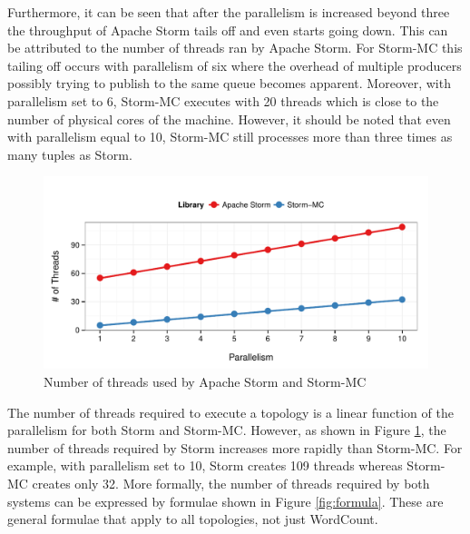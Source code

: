 \documentclass[bsc,deptreport,twoside,singlespacing,normalheadings,parskip]{infthesis}\usepackage[]{graphicx}\usepackage[]{color}
\makeatletter
\def\maxwidth{ %
  \ifdim\Gin@nat@width>\linewidth
    \linewidth
  \else
    \Gin@nat@width
  \fi
}
\newenvironment{knitrout}{}{} %
\makeatother
\begin{document}
Furthermore, it can be seen that after the parallelism is increased beyond three the throughput of Apache Storm tails off and even starts going down. This can be attributed to the number of threads ran by Apache Storm. For Storm-MC this tailing off occurs with parallelism of six where the overhead of multiple producers possibly trying to publish to the same queue becomes apparent. Moreover, with parallelism set to 6, Storm-MC executes with 20 threads which is close to the number of physical cores of the machine. However, it should be noted that even with parallelism equal to 10, Storm-MC still processes more than three times as many tuples as Storm.

\begin{knitrout}
\color{fgcolor}\begin{figure}[!htb]

{\centering \includegraphics[width=\maxwidth]{figure/threads-plot-1} 

}

\caption[Number of threads used by Apache Storm and Storm-MC]{Number of threads used by Apache Storm and Storm-MC}\label{fig:threads-plot}
\end{figure}


\end{knitrout}

The number of threads required to execute a topology is a linear function of the parallelism for both Storm and Storm-MC. However, as shown in Figure \ref{fig:threads-plot}, the number of threads required by Storm increases more rapidly than Storm-MC. For example, with parallelism set to 10, Storm creates 109 threads whereas Storm-MC creates only 32. More formally, the number of threads required by both systems can be expressed by formulae shown in Figure \ref{fig:formula}. These are general formulae that apply to all topologies, not just WordCount.
\end{document}
